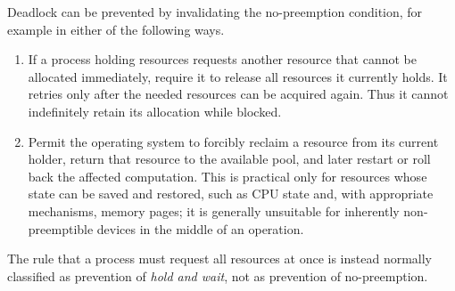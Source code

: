 Deadlock can be prevented by invalidating the no-preemption condition,
for example in either of the following ways.
\begin{enumerate}
 \item If a process holding resources requests another resource that
       cannot be allocated immediately, require it to release all
       resources it currently holds.  It retries only after the needed
       resources can be acquired again.  Thus it cannot indefinitely
       retain its allocation while blocked.
 \item Permit the operating system to forcibly reclaim a resource from
       its current holder, return that resource to the available pool,
       and later restart or roll back the affected computation.  This
       is practical only for resources whose state can be saved and
       restored, such as CPU state and, with appropriate mechanisms,
       memory pages; it is generally unsuitable for inherently
       non-preemptible devices in the middle of an operation.
\end{enumerate}
The rule that a process must request all resources at once is instead
normally classified as prevention of \emph{hold and wait}, not as
prevention of no-preemption.
